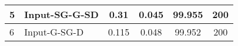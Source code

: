 \documentclass[conference]{IEEEtran}
\begin{document}
\begin{table}[ht]
\begin{tabular}{|l|l|c|c|c|c|}
		5                                                                                & Input-SG-G-SD                               & 0.31                                                                 & 0.045                                                               & 99.955                                                           & 200            \\ \hline
		6                                                                                & Input-G-SG-D                                & 0.115                                                                & 0.048                                                               & 99.952                                                           & 200            \\ \hline
	\end{tabular}
\end{table}
\end{document}
